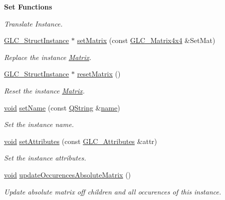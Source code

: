 \begin{Indent}{\bf Set Functions}
\begin{DoxyCompactItemize}
\begin{DoxyCompactList}\small\item\em Translate Instance. \end{DoxyCompactList}\item 
\hyperlink{class_g_l_c___struct_instance}{G\-L\-C\-\_\-\-Struct\-Instance} $\ast$ \hyperlink{class_g_l_c___struct_instance_a516113325adddef83c01f6a3f39caa2a}{set\-Matrix} (const \hyperlink{class_g_l_c___matrix4x4}{G\-L\-C\-\_\-\-Matrix4x4} \&Set\-Mat)
\begin{DoxyCompactList}\small\item\em Replace the instance \hyperlink{class_matrix}{Matrix}. \end{DoxyCompactList}\item 
\hyperlink{class_g_l_c___struct_instance}{G\-L\-C\-\_\-\-Struct\-Instance} $\ast$ \hyperlink{class_g_l_c___struct_instance_affd3df6f7a28e1624f3aded5b487fba1}{reset\-Matrix} ()
\begin{DoxyCompactList}\small\item\em Reset the instance \hyperlink{class_matrix}{Matrix}. \end{DoxyCompactList}\item 
\hyperlink{group___u_a_v_objects_plugin_ga444cf2ff3f0ecbe028adce838d373f5c}{void} \hyperlink{class_g_l_c___struct_instance_a5aaebe0c401ca94e0a6327541e285b2a}{set\-Name} (const \hyperlink{group___u_a_v_objects_plugin_gab9d252f49c333c94a72f97ce3105a32d}{Q\-String} \&\hyperlink{glext_8h_ad977737dfc9a274a62741b9500c49a32}{name})
\begin{DoxyCompactList}\small\item\em Set the instance name. \end{DoxyCompactList}\item 
\hyperlink{group___u_a_v_objects_plugin_ga444cf2ff3f0ecbe028adce838d373f5c}{void} \hyperlink{class_g_l_c___struct_instance_a0d6dda80c0f5e8af40ea90fba0d3f15f}{set\-Attributes} (const \hyperlink{class_g_l_c___attributes}{G\-L\-C\-\_\-\-Attributes} \&attr)
\begin{DoxyCompactList}\small\item\em Set the instance attributes. \end{DoxyCompactList}\item 
\hyperlink{group___u_a_v_objects_plugin_ga444cf2ff3f0ecbe028adce838d373f5c}{void} \hyperlink{class_g_l_c___struct_instance_ab859338da5f476f93aa9afa544760fe3}{update\-Occurences\-Absolute\-Matrix} ()
\begin{DoxyCompactList}\small\item\em Update absolute matrix off children and all occurences of this instance. \end{DoxyCompactList}\end{DoxyCompactItemize}
\end{Indent}


